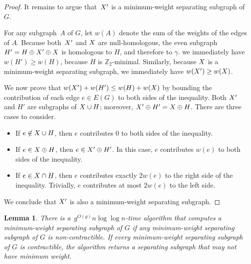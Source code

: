 \documentclass[11pt,twoside]{article}
\def\Z{\mathbb{Z}}
\newtheorem{lemma}[theorem]{Lemma}
\begin{document}
{\begin{proof}
It remains to argue that~$X'$ is a minimum-weight separating subgraph of $G$.

For any subgraph~$A$ of $G$, let $w(A)$ denote the sum of the weights of the edges of $A$.  Because both~$X'$ and $X$ are null-homologous, the even subgraph $H' = H \oplus X' \oplus X$ is homologous to $H$, and therefore to $\gamma$.  we immediately have $w(H') \ge w(H)$, because $H$ is $\Z_2$-minimal.  Similarly, because $X$ is a minimum-weight separating subgraph, we immediately have $w(X') \ge w(X)$.

  We now prove that $w(X') + w(H') \leq w(H) + w(X)$ by bounding the contribution of each edge $e \in E(G)$ to both sides of the inequality.  Both $X'$ and $H'$ are subgraphs of $X\cup H$; moreover, $X' \oplus H' = X \oplus H$.  There are three cases to consider.
\begin{itemize}
\item
If $e \not\in X\cup H$, then $e$ contributes $0$ to both sides of the inequality.
\item
If $e \in X \oplus H$, then $e \in X' \oplus H'$.  In this case, $e$ contributes $w(e)$ to both sides of the inequality.
\item
If $e \in X \cap H$, then $e$ contributes exactly $2w(e)$ to the right side of the inequality.  Trivially, $e$ contributes at most $2w(e)$ to the left side.
\end{itemize}
We conclude that $X'$ is also a minimum-weight separating subgraph.
\end{proof}

\begin{lemma}
\label{lem:global_split-alg}
There is a~$g^{O(g)} n \log \log n$-time algorithm that computes a minimum-weight separating subgraph of $G$ if any minimum-weight separating subgraph of $G$ is non-contractible.  If every minimum-weight separating subgraph of $G$ is contractible, the algorithm returns a separating subgraph that may not have minimum weight.
\end{lemma}

}
\end{document}
